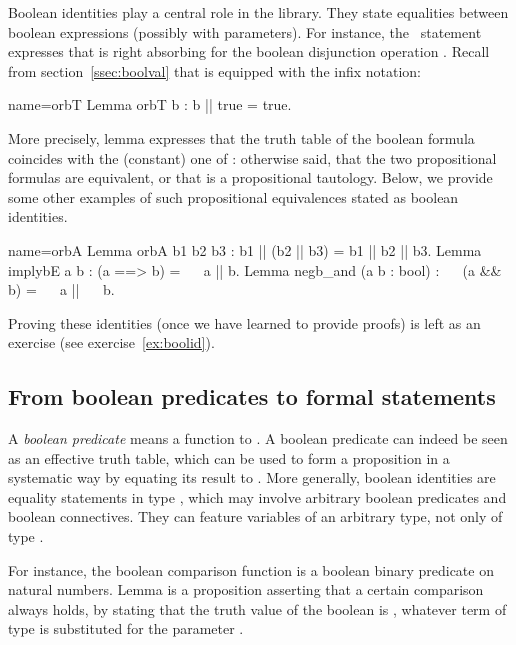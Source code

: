 Boolean identities play a central role in the \mcbMC{} library. They
state equalities between boolean expressions (possibly with parameters).
For
instance, the~ statement expresses that  is right absorbing
for the boolean disjunction operation . Recall from
section~\ref{ssec:boolval} that  is equipped with the \C{||}
infix notation:

\begin{coq}{name=orbT}{}
Lemma orbT b : b || true = true.
\end{coq}

More precisely, lemma 
expresses that the truth table of the boolean formula 
coincides with the (constant) one of : otherwise said, that the
two propositional formulas are equivalent, or that  is a
propositional tautology. Below, we provide some other examples of such
propositional equivalences stated as boolean identities.

\begin{coq}{name=orbA}{}
Lemma orbA b1 b2 b3 : b1 || (b2 || b3) = b1 || b2 || b3.
Lemma implybE a b : (a ==> b) = ~~ a || b.
Lemma negb_and (a b : bool) : ~~ (a && b) = ~~ a || ~~ b.
\end{coq}
Proving these identities (once we have learned to provide proofs)
is left as an exercise (see exercise~\ref{ex:boolid}).


\subsection{From boolean predicates to formal statements}
\label{sec:bstatements}

A \emph{boolean predicate} means a function to . A boolean
predicate can indeed be seen as an effective truth table, which can be
used to form a proposition in a systematic way by equating its result
to . More generally, boolean identities are equality statements
in type , which may involve arbitrary boolean predicates and boolean
connectives. They can feature variables of an arbitrary
type, not only of type .

For instance, the boolean comparison function
 is a boolean binary predicate on
natural numbers. Lemma  is a proposition asserting that a
certain comparison always holds, by stating that the truth value of
the boolean  is , whatever term  of type 
is substituted for the parameter .

